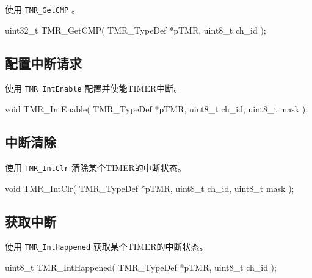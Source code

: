 \documentclass[
  12pt,
]{book}
\newenvironment{Shaded}{\begin{snugshade}}{\end{snugshade}}
\newcommand{\DataTypeTok}[1]{\textcolor[rgb]{0.13,0.29,0.53}{#1}}
\newcommand{\NormalTok}[1]{#1}
\begin{document}
使用 \texttt{TMR\_GetCMP} 。

\begin{Shaded}
\begin{Highlighting}[]
\DataTypeTok{uint32_t}\NormalTok{ TMR_GetCMP(}
\NormalTok{  TMR_TypeDef *pTMR, }
  \DataTypeTok{uint8_t}\NormalTok{ ch_id}
\NormalTok{  );}
\end{Highlighting}
\end{Shaded}

\hypertarget{ux914dux7f6eux4e2dux65adux8bf7ux6c42-2}{%
\subsection{配置中断请求}\label{ux914dux7f6eux4e2dux65adux8bf7ux6c42-2}}

使用 \texttt{TMR\_IntEnable} 配置并使能TIMER中断。

\begin{Shaded}
\begin{Highlighting}[]
\DataTypeTok{void}\NormalTok{ TMR_IntEnable(}
\NormalTok{  TMR_TypeDef *pTMR, }
  \DataTypeTok{uint8_t}\NormalTok{ ch_id, }
  \DataTypeTok{uint8_t}\NormalTok{ mask}
\NormalTok{  );}
\end{Highlighting}
\end{Shaded}

\hypertarget{ux4e2dux65adux6e05ux9664}{%
\subsection{中断清除}\label{ux4e2dux65adux6e05ux9664}}

使用 \texttt{TMR\_IntClr} 清除某个TIMER的中断状态。

\begin{Shaded}
\begin{Highlighting}[]
\DataTypeTok{void}\NormalTok{ TMR_IntClr(}
\NormalTok{  TMR_TypeDef *pTMR, }
  \DataTypeTok{uint8_t}\NormalTok{ ch_id, }
  \DataTypeTok{uint8_t}\NormalTok{ mask}
\NormalTok{  );}
\end{Highlighting}
\end{Shaded}

\hypertarget{ux83b7ux53d6ux4e2dux65ad}{%
\subsection{获取中断}\label{ux83b7ux53d6ux4e2dux65ad}}

使用 \texttt{TMR\_IntHappened} 获取某个TIMER的中断状态。

\begin{Shaded}
\begin{Highlighting}[]
\DataTypeTok{uint8_t}\NormalTok{ TMR_IntHappened(}
\NormalTok{  TMR_TypeDef *pTMR, }
  \DataTypeTok{uint8_t}\NormalTok{ ch_id}
\NormalTok{  );}
\end{Highlighting}
\end{Shaded}
\end{document}
